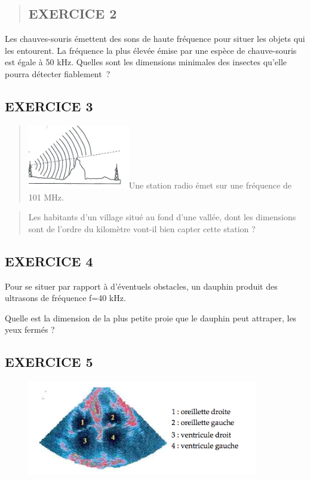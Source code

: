 {{{{{{{{{{\begin{quote}\subsection{EXERCICE 2}
\end{quote}

Les chauves-souris émettent des sons de haute fréquence pour situer les
objets qui les entourent. La fréquence la plus élevée émise par une
espèce de chauve-souris est égale à 50 kHz. Quelles sont les dimensions
minimales des insectes qu'elle pourra détecter fiablement~?
\subsection{EXERCICE 3}

\begin{quote}
\includegraphics[width=4.445cm,height=2.787cm]{Pictures/10000001000002E4000001CE9CDB74834F100431.png}Une
station radio émet sur une fréquence de 101 MHz.
\end{quote}

\begin{quote}
Les habitants d'un village situé au fond d'une vallée, dont les
dimensions sont de l'ordre du kilomètre vont-il bien capter cette
station ?
\end{quote}
\subsection{EXERCICE 4}

Pour se situer par rapport à d'éventuels obstacles, un dauphin produit
des ultrasons de fréquence f=40 kHz.

Quelle est la dimension de la plus petite proie que le dauphin peut
attraper, les yeux fermés ?
\subsection{EXERCICE 5 }

\begin{figure}
\centering
\includegraphics[width=10.084cm,height=4.142cm]{Pictures/10000001000001D1000000BF0020819CCFE94127.png}
\caption{}
\end{figure}

}}}}}}}}}}
